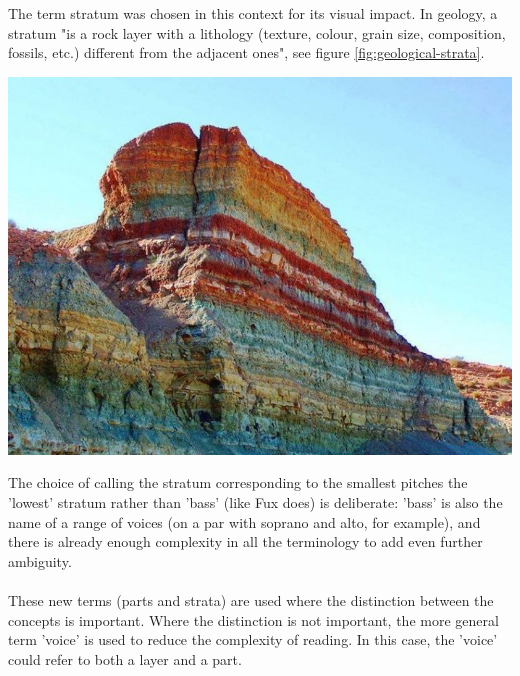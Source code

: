 \begin{minipage}{0.6\textwidth}
    The term stratum was chosen in this context for its visual impact. In geology, a stratum "is a rock layer with a lithology (texture, colour, grain size, composition, fossils, etc.) different from the adjacent ones", see figure \ref{fig:geological-strata}.
    \end{minipage}
    \hfill
    \begin{minipage}{0.3\textwidth}
      \centering
      \includegraphics[width=\textwidth]{Images/rainbow-sediment.jpg}
      \label{fig:geological-strata}
\end{minipage}
\vspace{.5cm}

The choice of calling the stratum corresponding to the smallest pitches the 'lowest' stratum rather than 'bass' (like Fux does) is deliberate: 'bass' is also the name of a range of voices (on a par with soprano and alto, for example), and there is already enough complexity in all the terminology to add even further ambiguity.

\paragraph{}
These new terms (parts and strata) are used where the distinction between the concepts is important. Where the distinction is not important, the more general term 'voice' is used to reduce the complexity of reading. In this case, the 'voice' could refer to both a layer and a part.

